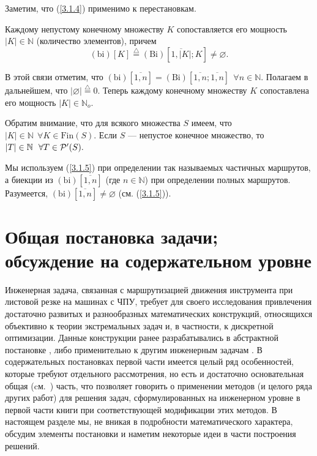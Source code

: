 \documentclass[11pt,twoside,openany]{report}
\newcommand{\bfn}{\begin{equation}}
\newcommand{\efn}{\end{equation}}
\newcommand{\df}{\stackrel{\triangle}{=}}
\newcommand{\ov}{\overline}
\newcommand{\fa}{\forall}
\newcommand{\cp}{{\cal P}}
\newcommand{\bbn}{{\mathbb N}}
\newcommand{\emp}{\varnothing}
\begin{document}
Заметим, что (\ref{3.1.4})
применимо к перестановкам.

Каждому непустому конечному множеству $K$
сопоставляется его мощность $|K|\in \bbn$
(количество элементов),
причем
\bfn
  \label{3.1.5}
  (\mathrm{bi})[K] \df (\mathrm{Bi})
  [\ov{1,|K|};K]\neq \emp.
\efn

В этой связи отметим,
что
$(\mathrm{bi})[\ov{1,n}] = (\mathrm{Bi})[\ov{1,n};
\ov{1,n}]\ \ \fa n\in \bbn.$
Полагаем в дальнейшем, что
$|\emp| \df 0.$
Теперь
каждому конечному множеству $K$
сопоставлена его мощность $|K| \in \bbn_o.$

Обратим внимание,
что для всякого множества $S$ имеем, что
$|K|\in \bbn\ \ \fa
K\in \mathrm{Fin}(S).$
Если $S$ --- непустое конечное множество, то
$|T|\in
\bbn\ \ \fa T\in \cp^\prime(S).$

Мы используем (\ref{3.1.5})
при определении так называемых частичных маршрутов,
а биекции из
$(\mathrm{bi})[\ov{1,n}]$ (где $n\in \bbn$)
при определении полных маршрутов.
Разумеется,
$(\mathrm{bi})[\ov{1,n}] \neq \emp$ (см. (\ref{3.1.5})).

{\raggedright\section{
  Общая постановка задачи;
  обсуждение на содержательном уровне
}}
\label{sect:3.2}

Инженерная задача,
связанная с маршрутизацией движения инструмента при листовой
резке на машинах с ЧПУ,
требует для своего исследования привлечения достаточно
развитых и разнообразных математических конструкций,
относящихся объективно к
теории экстремальных задач и,
в частности, к дискретной оптимизации.
Данные
конструкции ранее разрабатывались в абстрактной постановке \cite{Cha1`},
либо применительно к другим инженерным задачам \cite{Cha2`}.
В содержательных постановках
первой части имеется целый ряд особенностей,
которые требуют отдельного рассмотрения,
но есть и достаточно основательная общая
(cм.~\cite{Cha1`,Cha2`}) часть,
что позволяет
говорить о применении методов
\cite{Cha1`,Cha2`}
(и целого ряда других работ)
для решения задач,
сформулированных на инженерном уровне в первой части книги при
соответствующей модификации этих методов.
В настоящем разделе мы,
не вникая в
подробности математического характера,
обсудим элементы постановки и наметим
некоторые идеи в части построения решений.
\end{document}
